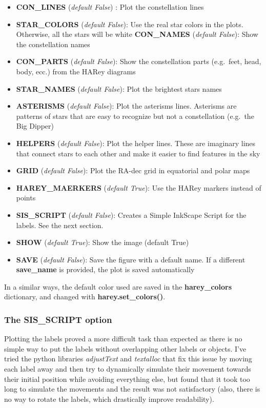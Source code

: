\documentclass[11pt]{article}
\providecommand{\tightlist}{%
      \setlength{\itemsep}{0pt}\setlength{\parskip}{0pt}}
\begin{document}
\begin{itemize}
\tightlist
\item
  \textbf{CON\_LINES} (\emph{default False}) : Plot the constellation
  lines
\item
  \textbf{STAR\_COLORS} (\emph{default False}): Use the real star colors
  in the plots. Otherwise, all the stars will be white
  \textbf{CON\_NAMES} (\emph{default False}): Show the constellation
  names
\item
  \textbf{CON\_PARTS} (\emph{default False}): Show the constellation
  parts (e.g.~feet, head, body, ecc.) from the HARey diagrams
\item
  \textbf{STAR\_NAMES} (\emph{default False}): Plot the brightest stars
  names
\item
  \textbf{ASTERISMS} (\emph{default False}): Plot the asterisms lines.
  Asterisms are patterns of stars that are easy to recognize but not a
  constellation (e.g.~the Big Dipper)
\item
  \textbf{HELPERS} (\emph{default False}): Plot the helper lines. These
  are imaginary lines that connect stars to each other and make it
  easier to find features in the sky
\item
  \textbf{GRID} (\emph{default False}): Plot the RA-dec grid in
  equatorial and polar maps
\item
  \textbf{HAREY\_MAERKERS} (\emph{default True}): Use the HARey markers
  instead of points
\item
  \textbf{SIS\_SCRIPT} (\emph{default False}): Creates a Simple InkScape
  Script for the labels. See the next section.
\item
  \textbf{SHOW} (\emph{default True}): Show the image (default True)
\item
  \textbf{SAVE} (\emph{default False}): Save the figure with a default
  name. If a different \textbf{save\_name} is provided, the plot is
  saved automatically
\end{itemize}

In a similar ways, the default color used are saved in the
\textbf{harey\_colors} dictionary, and changed with
\textbf{harey.set\_colors()}.

    \hypertarget{the-sis_script-option}{%
\subsubsection{The SIS\_SCRIPT option}\label{the-sis_script-option}}

Plotting the labels proved a more difficult task than expected as there
is no simple way to put the labels without overlapping other labels or
objects. I've tried the python libraries \emph{adjustText} and
\emph{textalloc} that fix this issue by moving each label away and then
try to dynamically simulate their movement towards their initial
position while avoiding everything else, but found that it took too long
to simulate the movements and the result was not satisfactory (also,
there is no way to rotate the labels, which drastically improve
readability).
\end{document}
